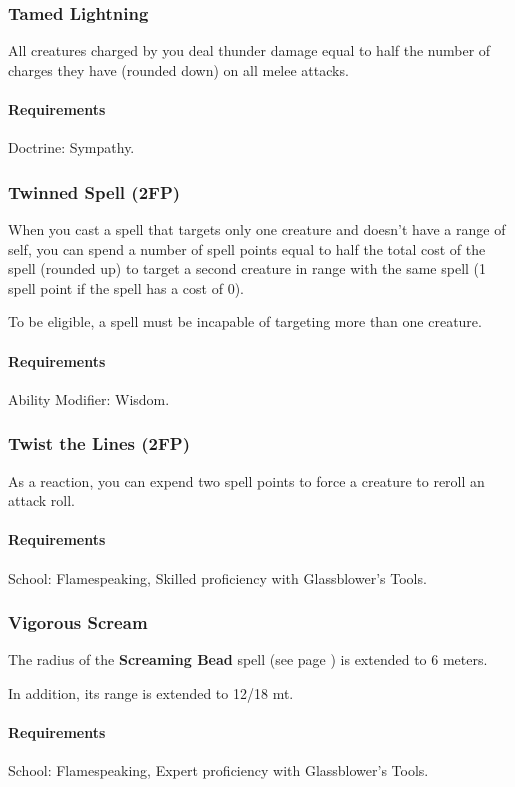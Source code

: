 \subsubsection{Tamed Lightning} \label{feat::tamedlightning}
    All creatures charged by you deal thunder damage equal to half the number of charges they have (rounded down) on all melee attacks.
    \paragraph{Requirements} Doctrine: Sympathy.
\subsubsection{Twinned Spell (2FP)} \label{feat::twinnedspell}
    When you cast a spell that targets only one creature and doesn't have a range of self, you can spend a number of spell points equal to half the total cost of the spell (rounded up) to target a second creature in range with the same spell (1 spell point if the spell has a cost of 0).

    To be eligible, a spell must be incapable of targeting more than one creature.
    \paragraph{Requirements} Ability Modifier: Wisdom.
\subsubsection{Twist the Lines (2FP)} \label{feat::twistthelines}
    As a reaction, you can expend two spell points to force a creature to reroll an attack roll.
    \paragraph{Requirements} School: Flamespeaking, Skilled proficiency with Glassblower's Tools.
\subsubsection{Vigorous Scream} \label{feat::vigorousscream}
    The radius of the \textbf{Screaming Bead} spell (see page \pageref{spell::screamingbead}) is extended to 6 meters.

    In addition, its range is extended to 12/18 mt.
    \paragraph{Requirements} School: Flamespeaking, Expert proficiency with Glassblower's Tools.
